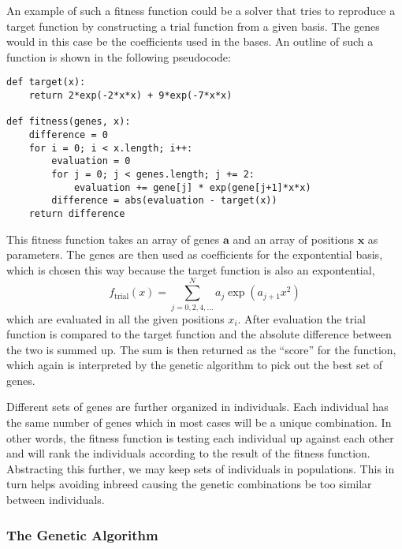 \documentclass[aps,prb,twocolumn,floatfix]{revtex4}
\renewcommand{\vec}{\mathbf}
\begin{document}
An example of such a fitness function could be a solver that tries to reproduce a target function by constructing a trial function from a given basis. The genes would in this case be the coefficients used in the bases. An outline of such a function is shown in the following pseudocode:
\begin{lstlisting}[caption=Pseudocode showing an outline of a fitness function that returns the absolute difference between the target function and the trial function.]
def target(x):
    return 2*exp(-2*x*x) + 9*exp(-7*x*x)

def fitness(genes, x):
    difference = 0
    for i = 0; i < x.length; i++:
        evaluation = 0
        for j = 0; j < genes.length; j += 2:
            evaluation += gene[j] * exp(gene[j+1]*x*x)
        difference = abs(evaluation - target(x))
    return difference
\end{lstlisting}
This fitness function takes an array of genes $\vec a$ and an array of positions $\vec x$ as parameters. The genes are then used as coefficients for the expontential basis, which is chosen this way because the target function is also an expontential,
\begin{equation}
    f_{\text{trial}}(x) = \sum_{j=0,2,4,\ldots}^{N} a_j \exp(a_{j+1}x^2)
\end{equation}
which are evaluated in all the given positions $x_i$. After evaluation the trial function is compared to the target function and the absolute difference between the two is summed up. The sum is then returned as the ``score'' for the function, which again is interpreted by the genetic algorithm to pick out the best set of genes.

Different sets of genes are further organized in individuals. Each individual has the same number of genes which in most cases will be a unique combination. In other words, the fitness function is testing each individual up against each other and will rank the individuals according to the result of the fitness function. Abstracting this further, we may keep sets of individuals in populations. This in turn helps avoiding inbreed causing the genetic combinations be too similar between individuals.

\subsubsection{The Genetic Algorithm}
\end{document}
